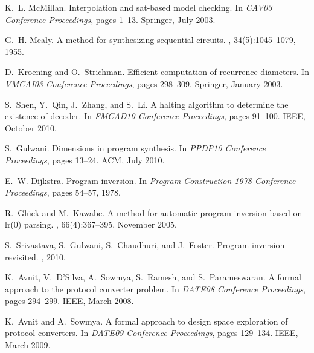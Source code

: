 \documentclass{sig-alternate}
\begin{document}
\begin{thebibliography}{10}
K.~L. McMillan.
\newblock Interpolation and sat-based model checking.
\newblock In {\em CAV03 Conference Proceedings}, pages 1--13. Springer, July
  2003.

G.~H. Mealy.
\newblock A method for synthesizing sequential circuits.
, 34(5):1045--1079, 1955.

D.~Kroening and O.~Strichman.
\newblock Efficient computation of recurrence diameters.
\newblock In {\em VMCAI03 Conference Proceedings}, pages 298--309. Springer,
  January 2003.

S.~Shen, Y.~Qin, J.~Zhang, and S.~Li.
\newblock A halting algorithm to determine the existence of decoder.
\newblock In {\em FMCAD10 Conference Proceedings}, pages 91--100. IEEE, October
  2010.

S.~Gulwani.
\newblock Dimensions in program synthesis.
\newblock In {\em PPDP10 Conference Proceedings}, pages 13--24. ACM, July 2010.

E.~W. Dijkstra.
\newblock Program inversion.
\newblock In {\em Program Construction 1978 Conference Proceedings}, pages
  54--57, 1978.

R.~Gl\"uck and M.~Kawabe.
\newblock A method for automatic program inversion based on lr(0) parsing.
, 66(4):367--395, November 2005.

S.~Srivastava, S.~Gulwani, S.~Chaudhuri, and J.~Foster.
\newblock Program inversion revisited.
, 2010.






K.~Avnit, V.~D'Silva, A.~Sowmya, S.~Ramesh, and S.~Parameswaran.
\newblock A formal approach to the protocol converter problem.
\newblock In {\em DATE08 Conference Proceedings}, pages 294--299. IEEE, March
  2008.

K.~Avnit and A.~Sowmya.
\newblock A formal approach to design space exploration of protocol converters.
\newblock In {\em DATE09 Conference Proceedings}, pages 129--134. IEEE, March
  2009.




\end{thebibliography}


\end{document}
